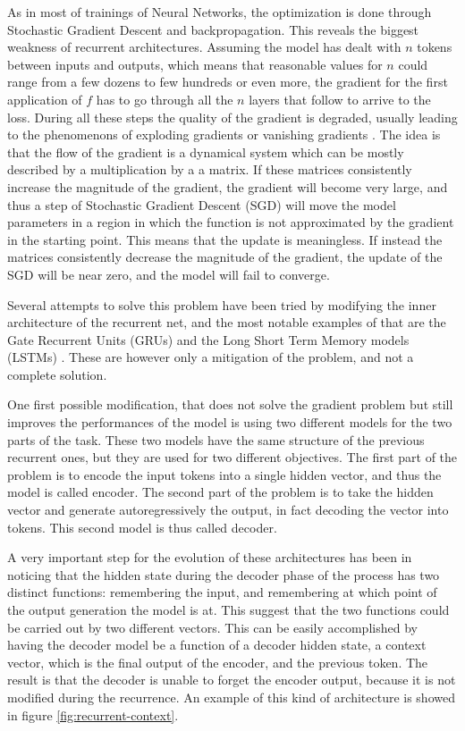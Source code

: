 \documentclass[]{marticle}
\begin{document}
As in most of trainings of Neural Networks, the optimization is done through Stochastic Gradient
Descent and backpropagation. This reveals the biggest weakness of recurrent architectures. Assuming
the model has dealt with $n$ tokens between inputs and outputs, which means that reasonable values
for $n$ could range from a few dozens to few hundreds or even more, the gradient for the first
application of $f$ has to go through all the $n$ layers that follow to arrive to the loss. During
all these steps the quality of the gradient is degraded, usually leading to the phenomenons of
exploding gradients or vanishing gradients \cite{difficult-rnn}. The idea is that the flow of the
gradient is a dynamical system which can be mostly described by a multiplication by a a matrix. If
these matrices consistently increase the magnitude of the gradient, the gradient will become very
large, and thus a step of Stochastic Gradient Descent (SGD) will move the model parameters in a
region in which the function is not approximated by the gradient in the starting point. This means
that the update is meaningless. If instead the matrices consistently decrease the magnitude of the
gradient, the update of the SGD will be near zero, and the model will fail to converge.

Several attempts to solve this problem have been tried by modifying the inner architecture of the
recurrent net, and the most notable examples of that are the Gate Recurrent Units (GRUs) and the
Long Short Term Memory models (LSTMs) \cite{gated-networks}. These are however only a mitigation of
the problem, and not a complete solution.

One first possible modification, that does not solve the gradient problem but still improves the
performances of the model is using two different models for the two parts of the task. These two
models have the same structure of the previous recurrent ones, but they are used for two different
objectives. The first part of the problem is to encode the input tokens into a single hidden vector,
and thus the model is called encoder. The second part of the problem is to take the hidden vector
and generate autoregressively the output, in fact decoding the vector into tokens. This second model
is thus called decoder.

A very important step for the evolution of these architectures has been in noticing that the hidden
state during the decoder phase of the process has two distinct functions: remembering the input, and
remembering at which point of the output generation the model is at. This suggest that the two
functions could be carried out by two different vectors. This can be easily accomplished by having
the decoder model be a function of a decoder hidden state, a context vector, which is the final
output of the encoder, and the previous token. The result is that the decoder is unable to forget
the encoder output, because it is not modified during the recurrence. An example of this kind of
architecture is showed in figure \ref{fig:recurrent-context}.
\end{document}
